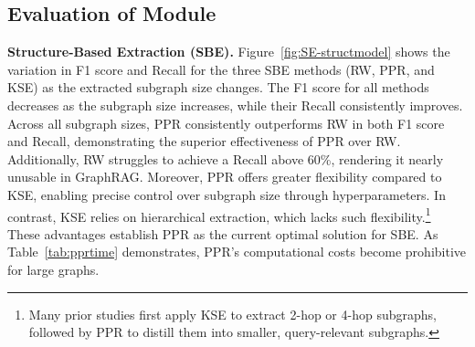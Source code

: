 \subsection{Evaluation of {\PreRetrieval} Module}
\label{exp:PreRetrieval}

{\bf Structure-Based Extraction (SBE).}  
Figure~\ref{fig:SE-structmodel}
shows the variation in F1 score and Recall for the three SBE methods (RW, PPR, and KSE) as the extracted subgraph size changes. The F1 score for all methods decreases as the subgraph size increases, while their Recall consistently improves. Across all subgraph sizes, PPR consistently outperforms RW in both F1 score and Recall, demonstrating the superior effectiveness of PPR over RW. Additionally, RW struggles to achieve a Recall above 60\%, rendering it nearly unusable in GraphRAG.  
Moreover, PPR offers greater flexibility compared to KSE, enabling precise control over subgraph size through hyperparameters. In contrast, KSE relies on hierarchical extraction, which lacks such flexibility.\footnote{Many prior studies {\cite{RoG,GCR,LessIsMore,StructGPT}} first apply KSE to extract 2-hop or 4-hop subgraphs, followed by PPR to distill them into smaller, query-relevant subgraphs.}
These advantages establish PPR as the current optimal solution for SBE. 
As Table~\ref{tab:pprtime} demonstrates, PPR's computational costs become prohibitive for large graphs. 



